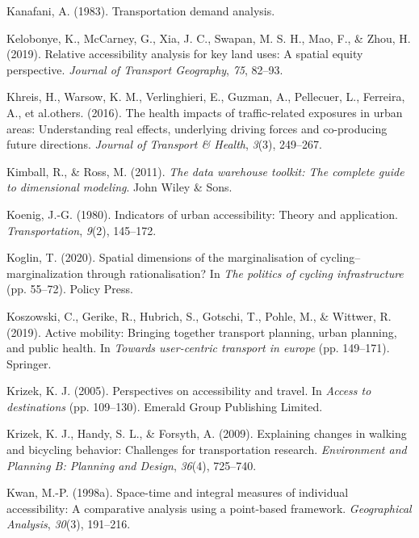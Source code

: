 \documentclass[
11pt, %
oneside, %
english, %
singlespacing, %
]{macthesis} %
\newlength{\cslhangindent}
\newenvironment{CSLReferences}[2] %
{\begin{list}{}{%
	\setlength{\itemindent}{0pt}
	\setlength{\leftmargin}{0pt}
	\setlength{\parsep}{0pt}
	\ifodd #1
	\setlength{\leftmargin}{\cslhangindent}
	\setlength{\itemindent}{-1\cslhangindent}
	\fi
	\setlength{\itemsep}{#2\baselineskip}}}
{\end{list}}
\begin{document}
\begin{CSLReferences}{1}{0}
Kanafani, A. (1983). Transportation demand analysis.

Kelobonye, K., McCarney, G., Xia, J. C., Swapan, M. S. H., Mao, F., \& Zhou, H. (2019). Relative accessibility analysis for key land uses: A spatial equity perspective. \emph{Journal of Transport Geography}, \emph{75}, 82--93.

Khreis, H., Warsow, K. M., Verlinghieri, E., Guzman, A., Pellecuer, L., Ferreira, A., et al.others. (2016). The health impacts of traffic-related exposures in urban areas: Understanding real effects, underlying driving forces and co-producing future directions. \emph{Journal of Transport \& Health}, \emph{3}(3), 249--267.

Kimball, R., \& Ross, M. (2011). \emph{The data warehouse toolkit: The complete guide to dimensional modeling}. John Wiley \& Sons.

Koenig, J.-G. (1980). Indicators of urban accessibility: Theory and application. \emph{Transportation}, \emph{9}(2), 145--172.

Koglin, T. (2020). Spatial dimensions of the marginalisation of cycling--marginalization through rationalisation? In \emph{The politics of cycling infrastructure} (pp. 55--72). Policy Press.

Koszowski, C., Gerike, R., Hubrich, S., Gotschi, T., Pohle, M., \& Wittwer, R. (2019). Active mobility: Bringing together transport planning, urban planning, and public health. In \emph{Towards user-centric transport in europe} (pp. 149--171). Springer.

Krizek, K. J. (2005). Perspectives on accessibility and travel. In \emph{Access to destinations} (pp. 109--130). Emerald Group Publishing Limited.

Krizek, K. J., Handy, S. L., \& Forsyth, A. (2009). Explaining changes in walking and bicycling behavior: Challenges for transportation research. \emph{Environment and Planning B: Planning and Design}, \emph{36}(4), 725--740.

Kwan, M.-P. (1998a). Space-time and integral measures of individual accessibility: A comparative analysis using a point-based framework. \emph{Geographical Analysis}, \emph{30}(3), 191--216.


\end{CSLReferences}
\end{document}
